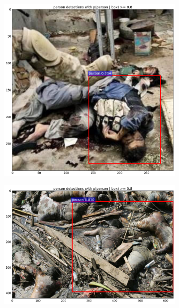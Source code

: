 \begin{figure}[ht]
\begin{subfigure}[b]{0.3\textwidth}
    \includegraphics[width=\textwidth]{idv3}
  \end{subfigure}             
  \begin{subfigure}[b]{0.3\textwidth}
    \includegraphics[width=\textwidth]{idv4}
  \end{subfigure}
  \begin{subfigure}[b]{0.3\textwidth}

\end{subfigure}
\end{figure}
